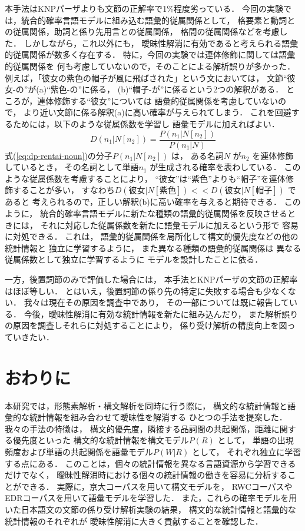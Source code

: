 本手法はKNPパーザよりも文節の正解率で1\%程度劣っている．
今回の実験では，統合的確率言語モデルに組み込む語彙的従属関係として，
格要素と動詞との従属関係，助詞と係り先用言との従属関係，
格間の従属関係などを考慮した．
しかしながら，これ以外にも，
曖昧性解消に有効であると考えられる語彙的従属関係が数多く存在する．
特に，今回の実験では連体修飾に関しては語彙的従属関係を
何も考慮していないので，そのことによる解析誤りが多かった．
例えば，「彼女の紫色の帽子が風に飛ばされた」という文においては，
文節``彼女-の''が(a)``紫色-の''に係る，
(b)``帽子-が''に係るという2つの解釈がある．
ところが，連体修飾する``彼女''については
語彙的従属関係を考慮していないので，
より近い文節に係る解釈(a)に高い確率が与えられてしまう．
これを回避するためには，以下のような従属係数を学習し
語彙モデルに加えればよい．
\begin{equation}
  \label{eq:dp-rentai-noun}
  D(n_1 | N[n_2]) = \frac{P(n_1 | N[n_2])}{P(n_1 | N)}
\end{equation}
式(\ref{eq:dp-rentai-noun})の分子$P(n_1 | N[n_2])$ は，
ある名詞$N$ が$n_2$ を連体修飾しているとき，
その名詞として単語$n_1$ が生成される確率を表わしている．
このような従属係数を考慮することにより，
``彼女''は``紫色''よりも``帽子''を連体修飾することが多い，
すなわち$D(彼女 | N[紫色]) << D(彼女 | N[帽子])$ であると
考えられるので，正しい解釈(b)に高い確率を与えると期待できる．
このように，
統合的確率言語モデルに新たな種類の語彙的従属関係を反映させるときには，
それに対応した従属係数を新たに語彙モデルに加えるという形で
容易に対処できる．
これは，
語彙的従属関係を局所化して構文的優先度などの他の統計情報と
独立に学習するように，
また異なる種類の語彙的従属関係は
異なる従属係数として独立に学習するように
モデルを設計したことに依る．

一方，後置詞節のみで評価した場合には，
本手法とKNPパーザの文節の正解率はほぼ等しい．
とはいえ，後置詞節の係り先の特定に失敗する場合も少なくない．
我々は現在その原因を調査中であり，
その一部については既に報告している\cite{sirai:97:d}．
今後，曖昧性解消に有効な統計情報を新たに組み込んだり，
また解析誤りの原因を調査しそれらに対処することにより，
係り受け解析の精度向上を図っていきたい．
\section{おわりに}
\label{sec:conclusion}

本研究では，形態素解析・構文解析を同時に行う際に，
構文的な統計情報と語彙的な統計情報を組み合わせて曖昧性を解消する
ひとつの手法を提案した．
我々の手法の特徴は，
構文的優先度，隣接する品詞間の共起関係，距離に関する優先度といった
構文的な統計情報を構文モデル$P(R)$ として，
単語の出現頻度および単語の共起関係を語彙モデル$P(W|R)$ として，
それぞれ独立に学習する点にある．
このことは，個々の統計情報を異なる言語資源から学習できるだけでなく，
曖昧性解消時における個々の統計情報の働きを容易に分析することができる．
実際に，京大コーパスを用いて構文モデルを，
RWCコーパスやEDRコーパスを用いて語彙モデルを学習した．
また，これらの確率モデルを用いた日本語文の文節の係り受け解析実験の結果，
構文的な統計情報と語彙的な統計情報のそれぞれが
曖昧性解消に大きく貢献することを確認した．

